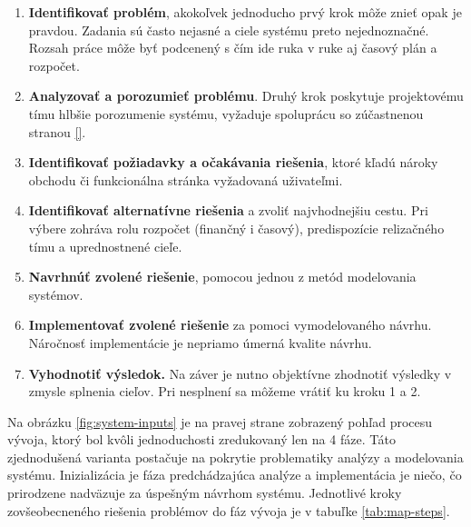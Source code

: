 \begin{enumerate}
	\item \textbf{Identifikovať problém}, akokoľvek jednoducho prvý krok môže znieť opak je pravdou. Zadania sú často nejasné a ciele systému preto nejednoznačné. Rozsah práce môže byť podcenený s čím ide ruka v ruke aj časový plán a rozpočet.
	\item \textbf{Analyzovať a porozumieť problému}. Druhý krok poskytuje projektovému tímu hlbšie porozumenie systému, vyžaduje spoluprácu so zúčastnenou stranou \ref{}.
	\item \textbf{Identifikovať požiadavky a očakávania riešenia}, ktoré kľadú nároky obchodu či funkcionálna stránka vyžadovaná uživateľmi.
	\item \textbf{Identifikovať alternatívne riešenia} a zvoliť najvhodnejšiu cestu. Pri výbere zohráva rolu rozpočet (finančný i časový), predispozície relizačného tímu a uprednostnené cieľe.
	\item \textbf{Navrhnúť zvolené riešenie}, pomocou jednou z metód modelovania systémov.
	\item \textbf{Implementovať zvolené riešenie} za pomoci vymodelovaného návrhu. Náročnosť implementácie je nepriamo úmerná kvalite návrhu.
	\item \textbf{Vyhodnotiť výsledok.} Na záver je nutno objektívne zhodnotiť výsledky v zmysle splnenia cieľov. Pri nesplnení sa môžeme vrátiť ku kroku 1 a 2.
\end{enumerate}
\vspace{1cm}
Na obrázku \ref{fig:system-inputs} je na pravej strane zobrazený pohľad procesu vývoja, ktorý bol kvôli jednoduchosti zredukovaný len na 4 fáze. Táto zjednodušená varianta postačuje na pokrytie problematiky analýzy a modelovania systému. Inizializácia je fáza predchádzajúca analýze a implementácia je niečo, čo prirodzene nadväzuje za úspešným návrhom systému. Jednotlivé kroky zovšeobecneného riešenia problémov do fáz vývoja je v tabuľke \ref{tab:map-steps}. \\

